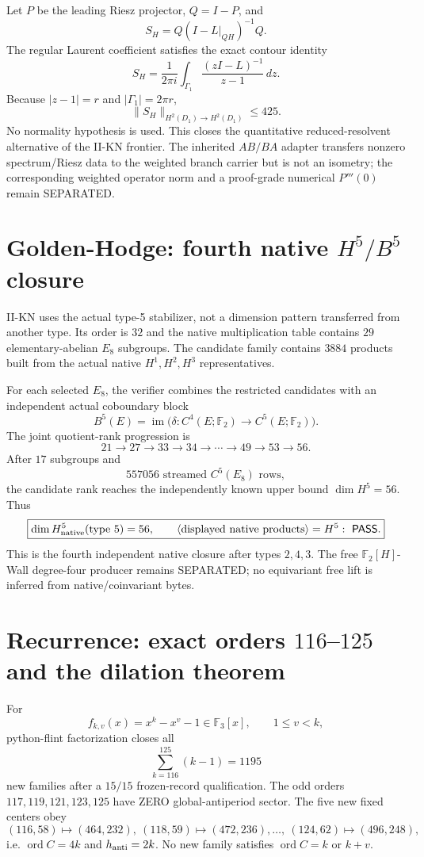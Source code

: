 \documentclass[9.5pt,a4paper]{article}
\newcommand{\PASS}{\textsf{PASS}}\newcommand{\ZERO}{\textsf{ZERO}}\newcommand{\SEP}{\textsf{SEPARATED}}\newcommand{\REF}{\textsf{REFUTED}}\newcommand{\NT}{\textsf{NT}}
\begin{document}
Let $P$ be the leading Riesz projector, $Q=I-P$, and
\[
S_H=Q(I-L|_{QH})^{-1}Q.
\]
The regular Laurent coefficient satisfies the exact contour identity
\[
S_H=\frac1{2\pi i}\int_{\Gamma_1}\frac{(zI-L)^{-1}}{z-1}\,dz.
\]
Because $|z-1|=r$ and $|\Gamma_1|=2\pi r$,
\[
\boxed{\|S_H\|_{H^2(D_1)\to H^2(D_1)}\le425.}
\]
No normality hypothesis is used.  This closes the quantitative reduced-resolvent alternative of the II-KN frontier.  The inherited $AB/BA$ adapter transfers nonzero spectrum/Riesz data to the weighted branch carrier but is not an isometry; the corresponding weighted operator norm and a proof-grade numerical $P'''(0)$ remain \SEP.

\section{Golden-Hodge: fourth native $H^5/B^5$ closure}
II-KN uses the actual type-5 stabilizer, not a dimension pattern transferred from another type.  Its order is $32$ and the native multiplication table contains $29$ elementary-abelian $E_8$ subgroups.  The candidate family contains $3884$ products built from the actual native $H^1,H^2,H^3$ representatives.

For each selected $E_8$, the verifier combines the restricted candidates with an independent actual coboundary block
\[
B^5(E)=\operatorname{im}\bigl(\delta:C^4(E;\mathbb F_2)\to C^5(E;\mathbb F_2)\bigr).
\]
The joint quotient-rank progression is
\[
21\to27\to33\to34\to\cdots\to49\to53\to\boxed{56}.
\]
After $17$ subgroups and
\[
\boxed{557056\text{ streamed }C^5(E_8)\text{ rows},}
\]
the candidate rank reaches the independently known upper bound $\dim H^5=56$.  Thus
\[
\boxed{\dim H^5_{\rm native}(\text{type }5)=56,\qquad
\langle\text{displayed native products}\rangle=H^5:\ \PASS.}
\]
This is the fourth independent native closure after types $2,4,3$.  The free $\mathbb F_2[H]$-Wall degree-four producer remains \SEP; no equivariant free lift is inferred from native/coinvariant bytes.

\section{Recurrence: exact orders $116$--$125$ and the dilation theorem}
For
\[
f_{k,v}(x)=x^k-x^v-1\in\mathbb F_3[x],\qquad1\le v<k,
\]
python-flint factorization closes all
\[
\boxed{\sum_{k=116}^{125}(k-1)=1195}
\]
new families after a $15/15$ frozen-record qualification.  The odd orders $117,119,121,123,125$ have \ZERO{} global-antiperiod sector.  The five new fixed centers obey
\[
(116,58)\mapsto(464,232),\ (118,59)\mapsto(472,236),\ldots,\ (124,62)\mapsto(496,248),
\]
i.e. $\operatorname{ord}C=4k$ and $h_{\rm anti}=2k$.  No new family satisfies $\operatorname{ord}C=k$ or $k+v$.
\end{document}
